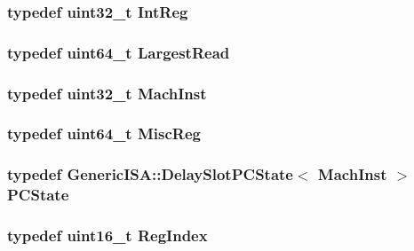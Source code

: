 \label{namespaceMipsISA_acc2693113a7cf1a4ff1c9d63b7de6451}
\hypertarget{namespaceMipsISA_adf027691dfdcdef6002693b1e033700d}{
\subsubsection[{IntReg}]{\setlength{\rightskip}{0pt plus 5cm}typedef {\bf uint32\_\-t} {\bf IntReg}}}
\label{namespaceMipsISA_adf027691dfdcdef6002693b1e033700d}
\hypertarget{namespaceMipsISA_a13e8c318dd29afdaf79751a072344db8}{
\subsubsection[{LargestRead}]{\setlength{\rightskip}{0pt plus 5cm}typedef uint64\_\-t {\bf LargestRead}}}
\label{namespaceMipsISA_a13e8c318dd29afdaf79751a072344db8}
\hypertarget{namespaceMipsISA_a301c22ea09fa33dcfe6ddf22f203699c}{
\subsubsection[{MachInst}]{\setlength{\rightskip}{0pt plus 5cm}typedef {\bf uint32\_\-t} {\bf MachInst}}}
\label{namespaceMipsISA_a301c22ea09fa33dcfe6ddf22f203699c}
\hypertarget{namespaceMipsISA_aa16539aa6584fd12f7d6fa868f75b4de}{
\subsubsection[{MiscReg}]{\setlength{\rightskip}{0pt plus 5cm}typedef uint64\_\-t {\bf MiscReg}}}
\label{namespaceMipsISA_aa16539aa6584fd12f7d6fa868f75b4de}
\hypertarget{namespaceMipsISA_a2435b8311a00a8168bb1d33fb7c79b1e}{
\subsubsection[{PCState}]{\setlength{\rightskip}{0pt plus 5cm}typedef {\bf GenericISA::DelaySlotPCState}$<$ {\bf MachInst} $>$ {\bf PCState}}}
\label{namespaceMipsISA_a2435b8311a00a8168bb1d33fb7c79b1e}
\hypertarget{namespaceMipsISA_a69329e1d929a534ff51be6cf8216b69a}{
\subsubsection[{RegIndex}]{\setlength{\rightskip}{0pt plus 5cm}typedef uint16\_\-t {\bf RegIndex}}}
\label{namespaceMipsISA_a69329e1d929a534ff51be6cf8216b69a}


